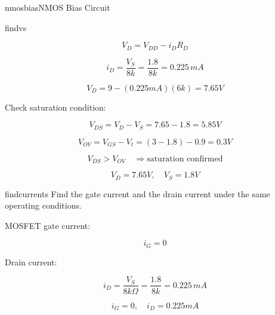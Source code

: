 \begin{mainquestion}{nmosbias}{NMOS Bias Circuit}
\begin{partquestion}{findvs}
\begin{answer}
\[
V_D = V_{DD} - i_D R_D
\]

\[
i_D = \frac{V_S}{8k} = \frac{1.8}{8k} = 0.225\,mA
\]

\[
V_D = 9 - (0.225mA)(6k) = 7.65V
\]

Check saturation condition:

\[
V_{DS} = V_D - V_S = 7.65 - 1.8 = 5.85V
\]

\[
V_{OV} = V_{GS} - V_t = (3-1.8) - 0.9 = 0.3V
\]

\[
V_{DS} > V_{OV} \quad \Rightarrow \text{saturation confirmed}
\]

\[
\boxed{V_D=7.65V,\quad V_S=1.8V}
\]
\end{answer}

\end{partquestion}

\begin{partquestion}{findcurrents}
{Find the gate current and the drain current under the same operating conditions.}

\begin{answer}
MOSFET gate current:

\[
i_G=0
\]

Drain current:

\[
i_D=\frac{V_S}{8k\Omega}
=\frac{1.8}{8k}
=0.225\,mA
\]

\[
\boxed{i_G=0,\quad i_D=0.225mA}
\]
\end{answer}

\end{partquestion}

\end{mainquestion}
